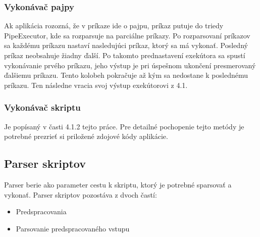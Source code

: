\subsubsection{Vykonávač pajpy}
\indent Ak aplikácia rozozná, že v príkaze ide o pajpu, príkaz putuje do triedy PipeExecutor, kde sa rozparsuje na parciálne príkazy. Po rozparsovaní príkazov sa každému príkazu nastaví nasledujúci príkaz, ktorý sa má vykonať. Posledný príkaz neobsahuje žiadny ďalší. Po takomto prednastavení exekútora sa spustí vykonávanie prvého príkazu, jeho výstup je pri úspešnom ukončení presmerovaný ďalšiemu príkazu. Tento kolobeh pokračuje až kým sa nedostane k poslednému príkazu. Ten následne vracia svoj výstup exekútorovi z 4.1.
\subsubsection{Vykonávač skriptu}
\indent Je popísaný v časti 4.1.2 tejto práce. Pre detailné pochopenie tejto metódy je potrebné prezrieť si priložené zdojové kódy aplikácie.
\subsection{Parser skriptov}
\indent Parser berie ako parameter cestu k skriptu, ktorý je potrebné sparsovať a vykonať. Parser skriptov pozostáva z dvoch častí: 
\begin{itemize}
	\item Predspracovania
	\item Parsovanie predspracovaného vstupu
\end{itemize}
